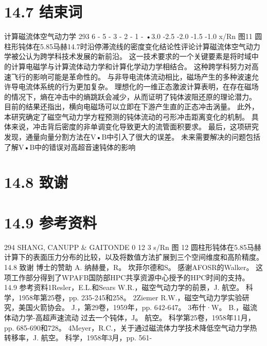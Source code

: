 \documentclass[UTF8,11pt,a4paper,openany,fontset=fandol]{ctexbook}
\begin{document}
\section{14.7 结束词}
计算磁流体空气动力学 293 6 - 5 - 3 - 2 - 1 - •3.0 -2.5 -2.0 -1.5 -1.0 x/Rn 图11 圆柱形钝体在5.85马赫14.7时沿停滞流线的密度变化结论性评论计算磁流体空气动力学被公认为跨学科技术发展的新前沿。 这一技术要求的一个关键要素是将时域中的计算电磁学与计算流体动力学和计算化学动力学相结合。 这种跨学科努力对高速飞行的影响可能是革命性的。 与非导电流体流动相比，磁场产生的多种波速允许导电流体系统的行为更加复杂。 理想化的一维正态激波计算表明，在存在磁场的情况下，熵在冲击中的熵跳跃会减少，从而证明了钝体波阻还原的理论潜力。 目前的结果还指出，横向电磁场可以立即在下游产生直的正态冲击涡量。 此外，本研究确定了磁空气动力学方程预测的钝体流动的弓形冲击距离变化的机制。 具体来说，冲击背后密度的非单调变化导致更大的流管面积要求。 最后，这项研究发现，通量向量分割方法在V•B中引入了很大的误差。 未来需要解决的问题包括了解V•B中的错误对高超音速钝体的影响

\section{14.8 致谢}
\section{14.9 参考资料}
294 SHANG, CANUPP \& GAITONDE 0 12 3 s/Rn 图 12 圆柱形钝体在5.85马赫计算下的表面压力分布的比较，以及将数值方法扩展到三个空间维度和高阶精度。 14.8 致谢 博士的赞助 A. 纳赫曼，R。 坎菲尔德和S。 感谢AFOSR的Walker。 这项工作部分得到了WPAFB国防部HPC共享资源中心授予的HPC时间的支持。 14.9 参考资料1Resler，E.L.和Sears W.R.，磁空气动力学的前景，J. 航空。 科学，1958年第25卷，pp. 235-245和258。 2Ziemer R.W.，磁空气动力学实验研究，美国火箭协会。 J.，第29卷，1959年，pp. 642-647。 3布什·W。 B.，磁流体动力学-高超声速流动 过去一个钝体，J。 航空。 科学第25卷，1958年11月，pp. 685-690和728。 4Meyer，R.C.，关于通过磁流体力学技术降低空气动力学热转移率，J. 航空。 科学，1958年3月，pp. 561-
\end{document}
